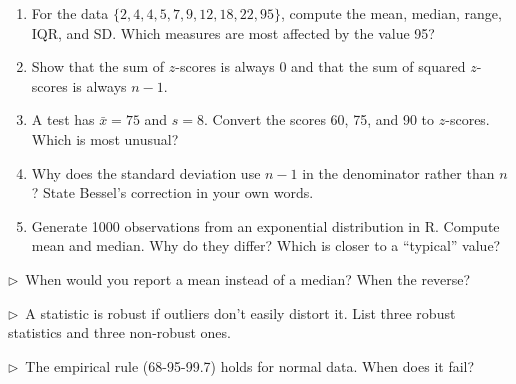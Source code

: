 \begin{enumerate}
  \item For the data $\{2, 4, 4, 5, 7, 9, 12, 18, 22, 95\}$, compute the mean, median, range, IQR, and SD. Which measures are most affected by the value 95?
  \item Show that the sum of $z$-scores is always 0 and that the sum of squared $z$-scores is always $n - 1$.
  \item A test has $\bar{x} = 75$ and $s = 8$. Convert the scores 60, 75, and 90 to $z$-scores. Which is most unusual?
  \item Why does the standard deviation use $n - 1$ in the denominator rather than $n$? State Bessel's correction in your own words.
  \item Generate 1000 observations from an exponential distribution in R. Compute mean and median. Why do they differ? Which is closer to a ``typical'' value?
\end{enumerate}

\begin{reflect}
$\triangleright$~When would you report a mean instead of a median? When the reverse?

\smallskip
$\triangleright$~A statistic is robust if outliers don't easily distort it. List three robust statistics and three non-robust ones.

\smallskip
$\triangleright$~The empirical rule (68-95-99.7) holds for normal data. When does it fail?
\end{reflect}
